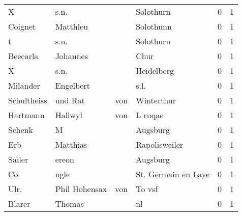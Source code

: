 \begin{center}
\begin{tiny}
\begin{longtabu}{llllrr}
                        X &                               s.n. &             &                                   Solothurn &          0 &         1 \\
                  Coignet &                           Matthleu &             &                                   Solothunn &          0 &         1 \\
                        t &                               s.n. &             &                                   Solothurn &          0 &         1 \\
                 Beecarla &                           Johannes &             &                                        Chur &          0 &         1 \\
                        X &                               s.n. &             &                                  Heidelberg &          0 &         1 \\
                 Milander &                          Engelbert &             &                                        s.l. &          0 &         1 \\
              Schultheiss &                            und Rat &         von &                                  Winterthur &          0 &         1 \\
                 Hartmann &                            Hallwyl &         von &                                     L ruqae &          0 &         1 \\
                   Schenk &                                  M &             &                                    Augsburg &          0 &         1 \\
                      Erb &                           Matthias &             &                               Rapolisweiler &          0 &         1 \\
                   Sailer &                              ereon &             &                                    Augsburg &          0 &         1 \\
                       Co &                               ngle &             &                         St. Germain en Laye &          0 &         1 \\
                     Ulr. &                     Phil  Hohensax &         von &                                      To vsf &          0 &         1 \\
                   Blarer &                             Thomas &             &                                          nl &          0 &         1 \\

\end{longtabu}
\end{tiny}
\end{center}
